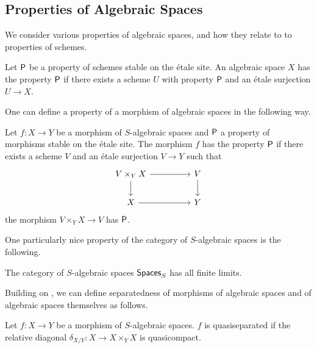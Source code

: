 \subsection{Properties of Algebraic Spaces}
We consider various properties of algebraic spaces, and how they relate to to properties of schemes. 
\begin{definition}\label{def: property of algebraic space}
    Let $\mathsf{P}$ be a property of schemes stable on the \'{e}tale site. An algebraic space $X$ has the property $\mathsf{P}$ if there exists a scheme $U$ with property $\mathsf{P}$ and an \'{e}tale surjection $U\to X$.
\end{definition}
One can define a property of a morphism of algebraic spaces in the following way. 
\begin{definition}\label{def: property of morphisms of spaces}
    Let $f:X\to Y$ be a morphism of $S$-algebraic spaces and $\mathsf{P}$ a property of morphisms stable on the \'{e}tale site. The morphism $f$ has the property $\mathsf{P}$ if there exists a scheme $V$ and an \'{e}tale surjection $V\to Y$ such that 
    $$%
    \begin{tikzcd}
        {V\times_{Y}X} && V \\
        X && Y
        \arrow[from=1-3, to=2-3]
        \arrow[from=2-1, to=2-3]
        \arrow[from=1-1, to=1-3]
        \arrow[from=1-1, to=2-1]
    \end{tikzcd}$$
    the morphism $V\times_{Y}X\to V$ has $\mathsf{P}$. 
\end{definition}
One particularly nice property of the category of $S$-algebraic spaces is the following. 
\begin{proposition}\label{prop: spaces has all colimits}
    The category of $S$-algebraic spaces $\mathsf{Spaces}_{S}$ has all finite limits. 
\end{proposition}
Building on , we can define separatedness of morphisms of algebraic spaces and of algebraic spaces themselves as follows. 
\begin{definition}\label{def: quasiseparated morphism of spaces}
    Let $f:X\to Y$ be a morphism of $S$-algebraic spaces. $f$ is quasiseparated if the relative diagonal $\delta_{X/Y}:X\to X\times_{Y}X$ is quasicompact. 
\end{definition}
